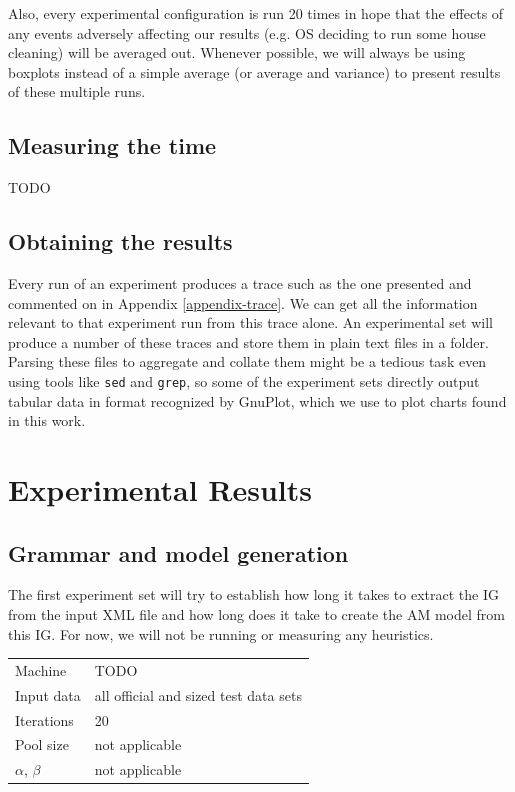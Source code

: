 Also, every experimental configuration is run 20 times in hope that the effects of any events adversely affecting our results (e.g. OS deciding to run some house cleaning) will be averaged out. Whenever possible, we will always be using boxplots instead of a simple average (or average and variance) to present results of these multiple runs. %

\subsection{Measuring the time}

TODO

\subsection{Obtaining the results}

Every run of an experiment produces a trace such as the one presented and commented on in Appendix \ref{appendix-trace}. We can get all the information relevant to that experiment run from this trace alone. An experimental set will produce a number of these traces and store them in plain text files in a folder. Parsing these files to aggregate and collate them might be a tedious task even using tools like \texttt{sed} and \texttt{grep}, so some of the experiment sets directly output tabular data in format recognized by GnuPlot, which we use to plot charts found in this work.

\section{Experimental Results}

\subsection{Grammar and model generation}


The first experiment set will try to establish how long it takes to extract the IG %
from the input XML file and how long does it take to create the AM model from this IG. For now, we will not be running or measuring any heuristics.

\begin{center}
\bigskip
\begin{tabular}{| l | l |}
  \hline
  \hline
  Machine           & TODO \\
  Input data        & all official and sized test data sets \\
  Iterations        & 20 \\
  Pool size         & not applicable \\
  $\alpha$, $\beta$ & not applicable \\
  \hline
\end{tabular}
\bigskip
\end{center}

